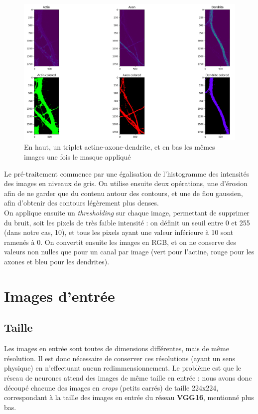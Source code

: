\documentclass{report}
\begin{document}
\begin{figure}[H]
\centering
\includegraphics[scale=0.35]{"ex_mask"}
\caption{En haut, un triplet actine-axone-dendrite, et en bas les mêmes images une fois le masque appliqué}
\end{figure}

Le pré-traitement commence par une égalisation de l'histogramme des intensités
des images en niveaux de gris. On utilise ensuite deux opérations, une d'érosion
afin de ne garder que du contenu autour des contours, et une de flou gaussien,
afin d'obtenir des contours légèrement plus denses. \\
On applique ensuite un \textit{thresholding} sur chaque image,
permettant de supprimer du bruit, soit les pixels de très faible intensité :
on définit un seuil entre 0 et 255 (dans notre cas, 10), et tous les pixels ayant
une valeur inférieure à 10 sont ramenés à 0. On convertit ensuite les images en
RGB, et on ne conserve des valeurs non nulles que pour un canal par image (vert pour
l'actine, rouge pour les axones et bleu pour les dendrites).

\section{Images d'entrée}

\subsection{Taille}

Les images en entrée sont toutes de dimensions différentes, mais de même résolution.
Il est donc nécessaire de conserver ces résolutions (ayant un sens physique) en
n'effectuant aucun redimmensionnement. Le problème est que le réseau de neurones
attend des images de même taille en entrée : nous avons donc découpé chacune des
images en \textit{crops} (petits carrés) de taille 224x224, correspondant à la taille
des images en entrée du réseau \textbf{VGG16}, mentionné plus bas.
\end{document}
